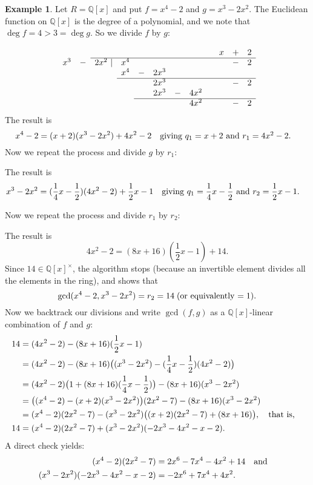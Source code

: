 \documentclass[12pt]{article}
\newcommand{\qbox}[1]{\quad\hbox{#1}\quad}
\def\dst{\displaystyle}
\theoremstyle{definition}
\newtheorem{example}[thm]{Example}
\newcounter{ex}\renewcommand\theex{\arabic{ex}}
\newcommand{\Q}{\ensuremath{\mathbb{Q}}}
\begin{document}
\begin{example}
Let $R=\Q[x]$ and put $f=x^4-2$ and $g=x^3-2x^2$. The Euclidean
function on $\Q[x]$ is the degree of a polynomial, and we note that
$\deg f=4>3=\deg g$. So we divide $f$ by $g$:

$$\begin{array}{rcrrcrcrcrcrcr}
&&&&&&&&&x&+&2\\
\cline{3-12}
x^3&-&2x^2~|&x^4&&&&&&&-&2\\
&&&x^4&-&2x^3\\
\cline{4-12}
&&&&&2x^3&&&&&-&2\\
&&&&&2x^3&-&4x^2\\
\cline{5-12}
&&&&&&&4x^2&&&-&2
\end{array}$$
The result is
$$x^4-2=(x+2)(x^3-2x^2)+4x^2-2\qbox{giving $q_1=x+2$ and
$r_1=4x^2-2$.}$$
Now we repeat the process and divide $g$ by $r_1$:

\vspace{2cm}

The result is
$$x^3-2x^2=(\frac14x-\frac12)(4x^2-2)+\frac12x-1
\qbox{giving $\dst q_1=\frac14x-\frac12$ and $\dst r_2=\dst\frac12x-1$.}$$

Now we repeat the process and divide $r_1$ by $r_2$:

\vspace{2cm}

The result is
$$4x^2-2=(8x+16)(\frac12x-1)+14.$$
Since $14\in\Q[x]^\times$, the algorithm stops (because an invertible
element divides all the elements in the ring), and shows that
$$\gcd(x^4-2,x^3-2x^2)=r_2=14\;\hbox{(or equivalently $=1$).}$$
Now we backtrack our divisions and write $\gcd(f,g)$ as a
$\Q[x]$-linear combination of $f$ and $g$:
\begin{align*}
14&=(4x^2-2)-(8x+16)(\frac12x-1)\\
&=(4x^2-2)-(8x+16)\big((x^3-2x^2)-(\frac14x-\frac12)(4x^2-2)\big)\\
&=(4x^2-2)\big(1+(8x+16)(\frac14x-\frac12)\big)-(8x+16)(x^3-2x^2)\\
&=\big((x^4-2)-(x+2)(x^3-2x^2)\big)(2x^2-7)-(8x+16)(x^3-2x^2)\\
&=(x^4-2)(2x^2-7)-(x^3-2x^2)\big((x+2)(2x^2-7)+(8x+16)\big),\qbox{that is,}\\
14&=(x^4-2)(2x^2-7)+(x^3-2x^2)(-2x^3-4x^2-x-2).
\end{align*}
A direct check yields:
\begin{align*}
(x^4-2)(2x^2-7)&=2x^6-7x^4-4x^2+14\qbox{and}\\
(x^3-2x^2)(-2x^3-4x^2-x-2)&=-2x^6+7x^4+4x^2.
\end{align*}
\end{example}
\end{document}
